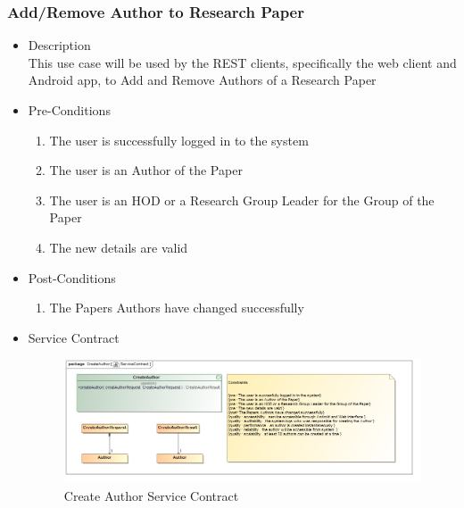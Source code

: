 \documentclass[a4paper,10pt]{article}
\begin{document}
\subsubsection{Add/Remove Author to Research Paper}
	\begin{itemize}
		\item Description\\
			This use case will be used by the REST clients, specifically the web client and Android app, to Add and Remove Authors of a Research Paper
		\item Pre-Conditions
			\begin{enumerate}
				\item The user is successfully logged in to the system
				\item The user is an Author of the Paper
				\item The user is an HOD or a Research Group Leader for the Group of the Paper
				\item The new details are valid
			\end{enumerate}
		\item Post-Conditions
			\begin{enumerate}
				\item The Papers Authors have changed successfully
						
			\end{enumerate}
		\item Service Contract
			\begin{figure}[H]
				\includegraphics[scale=0.5]{CreateAuthorServiceContract}
				\caption{Create Author Service Contract}
			\end{figure}



	\end{itemize}
\end{document}
